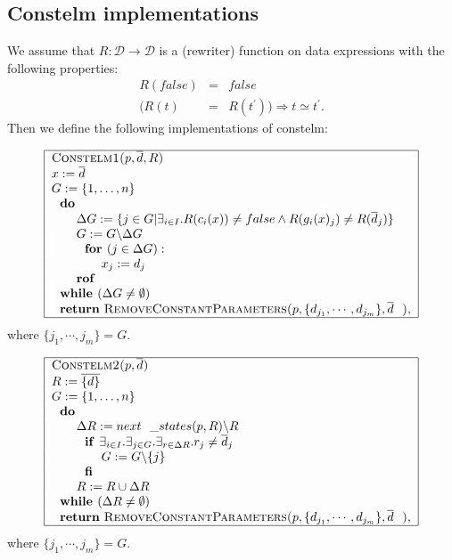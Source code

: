 \documentclass{article}
\begin{document}
\subsection{Constelm implementations}

We assume that $R:\mathcal{D\rightarrow D}$ is a (rewriter) function on data
expressions with the following properties:%
\begin{eqnarray*}
R(false) &=&false \\
(R(t) &=&R(t^{\prime }))\Rightarrow t\simeq t^{\prime }\text{.}
\end{eqnarray*}%
Then we define the following implementations of constelm:

\[
\begin{tabular}{|l|}
\hline
\textsc{Constelm1(}$p,\overline{d},R$\textsc{)} \\ 
$x:=\overline{d}$ \\ 
$G:=\{1,\ldots ,n\}$ \\ 
$\text{\textbf{do}}$ \\ 
$\qquad \Delta G:=\{j\in G|\exists _{i\in I}.R(c_{i}(x))\neq false\wedge
R(g_{i}(x)_{j})\neq R(\overline{d}_{j})\}$ \\ 
$\qquad G:=G\backslash \Delta G$ \\ 
$\qquad \text{\textbf{for }}(j\in \Delta G):$ \\ 
$\qquad \qquad x_{j}:=d_{j}$ \\ 
$\qquad $\textbf{rof} \\ 
$\text{\textbf{while }}(\Delta G\neq \emptyset )$ \\ 
$\text{\textbf{return} \textsc{RemoveConstantParameters(}}%
p,\{d_{j_{1}},\cdots ,d_{j_{m}}\},\overline{d}\text{\textsc{)}},$ \\ \hline
\end{tabular}%
\]%
where $\{j_{1},\cdots ,j_{m}\}=G$.

\[
\begin{tabular}{|l|}
\hline
\textsc{Constelm2(}$p,\overline{d}$\textsc{)} \\ 
$R:=\overline{\{d\}}$ \\ 
$G:=\{1,\ldots ,n\}$ \\ 
$\text{\textbf{do}}$ \\ 
$\qquad \Delta R:=next\_states(p,R)\backslash R$ \\ 
$\qquad \text{\textbf{if }}\exists _{i\in I}.\exists _{j\in G}.\exists
_{r\in \Delta R}.r_{j}\neq \overline{d}_{j}$ \\ 
$\qquad \qquad G:=G\backslash \{j\}$ \\ 
$\qquad \text{\textbf{fi}}$ \\ 
$\qquad R:=R\cup \Delta R$ \\ 
$\text{\textbf{while }}(\Delta R\neq \emptyset )$ \\ 
$\text{\textbf{return} \textsc{RemoveConstantParameters(}}%
p,\{d_{j_{1}},\cdots ,d_{j_{m}}\},\overline{d}\text{\textsc{)}},$ \\ \hline
\end{tabular}%
\]%
where $\{j_{1},\cdots ,j_{m}\}=G$.
\end{document}
